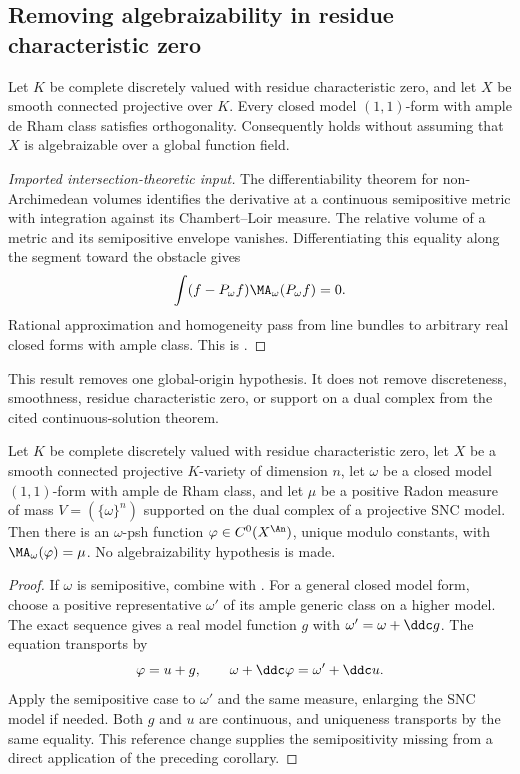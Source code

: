 \subsection{Removing algebraizability in residue characteristic zero}
\label{sec:ch29-remove-algebraizability}

\begin{theorem}\label{thm:bggjkm-remove-algebraizability}
Let $K$ be complete discretely valued with residue characteristic zero,
and let $X$ be smooth connected projective over $K$.  Every closed
model $(1,1)$-form
with ample de Rham class satisfies orthogonality.  Consequently
 holds without assuming
that $X$ is algebraizable over a global function field.
\end{theorem}

\begin{proof}[Imported intersection-theoretic input]
The differentiability theorem for non-Archimedean volumes identifies the
derivative at a continuous semipositive metric with integration against its
Chambert--Loir measure.  The relative volume of a metric and its semipositive
envelope vanishes.  Differentiating this equality along the segment toward
the obstacle gives
\[
 \int(f-P_\omega f)\MA_\omega(P_\omega f)=0.
\]
Rational approximation and homogeneity pass from line bundles to arbitrary
real closed forms with ample class.  This is
\cite[Theorem~6.3.3 and Corollary~6.3.4]{BGGJKM20}.
\end{proof}

This result removes one global-origin hypothesis.  It does not remove
discreteness, smoothness, residue characteristic zero, or support on a dual
complex from the cited continuous-solution theorem.

\begin{corollary}
\label{cor:ch29-bggjkm-cy}
Let $K$ be complete discretely valued with residue characteristic zero,
let $X$ be a smooth connected projective $K$-variety of dimension $n$,
let $\omega$ be a closed model $(1,1)$-form with ample de Rham class, and let
$\mu$ be a positive Radon measure of mass $V=(\{\omega\}^n)$ supported
on the dual complex of a projective SNC model.  Then there is an
$\omega$-psh function $\varphi\in C^0(X^{\An})$, unique modulo
constants, with $\MA_\omega(\varphi)=\mu$.  No algebraizability
hypothesis is made.
\end{corollary}

\begin{proof}
If $\omega$ is semipositive, combine
 with
.  For a general closed
model form, choose a positive representative $\omega'$ of its ample
generic class on a higher model.  The exact sequence
 gives a real model function $g$ with
$\omega'=\omega+\ddc g$.  The equation transports by
\[
 \varphi=u+g,\qquad
 \omega+\ddc\varphi=\omega'+\ddc u .
\]
Apply the semipositive case to $\omega'$ and the same measure, enlarging
the SNC model if needed.  Both $g$ and $u$ are continuous, and uniqueness
transports by the same equality.  This reference change supplies the
semipositivity missing from a direct application of the preceding
corollary.
\end{proof}

